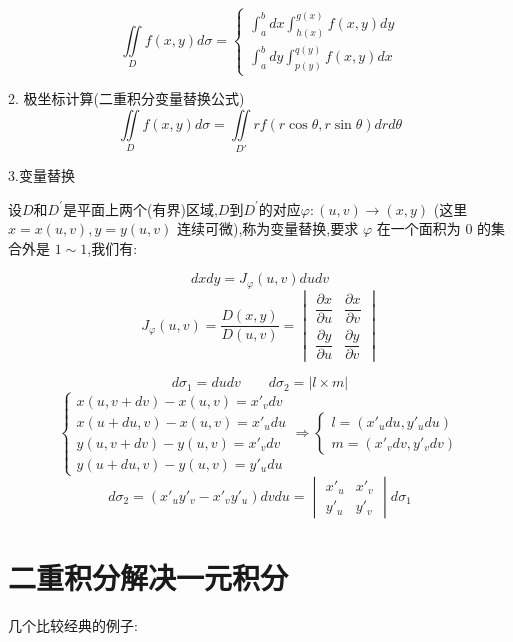 $$\iint\limits_{D}f(x,y)d\sigma=
\begin{cases} \int_{a}^{b}dx\int_{h(x)}^{g(x)}f(x,y)dy \\
	\int_{a}^{b}dy\int_{p(y)}^{q(y)}f(x,y)dx\end{cases}$$

2. 极坐标计算(二重积分变量替换公式)\label{def: 极坐标计算二重积分}
$$\iint\limits_{D}f(x,y)d\sigma=\iint\limits_{D'}rf(r\cos \theta,r\sin \theta)drd\theta$$

3.变量替换\label{def: 变量替换}

设$D$和$D^{'}$是平面上两个(有界)区域,$D$到$D^{'}$的对应$\varphi :(u,v)\rightarrow(x,y)$ (这里 $x=x(u,v),y=y(u,v)$ 连续可微),称为变量替换,要求 $\varphi$ 在一个面积为 $0$ 的集合外是 $1\sim 1$,我们有:

$$dxdy=J_{\varphi}(u,v)dudv$$ 
$$J_{\varphi}(u,v)=\dfrac{D(x,y)}{D(u,v)}=
\begin{vmatrix}
	\dfrac{\partial x}{\partial u} & \dfrac{\partial x}{\partial v} \\
	\dfrac{\partial y}{\partial u} & \dfrac{\partial y}{\partial v}
\end{vmatrix}
$$

\begin{anymark}[注]
	$$d\sigma_{1}=dudv \qquad d\sigma_{2}=|l\times m|$$
	$$\begin{cases}
		x(u,v+dv)-x(u,v)=x'_{v}dv \\
		x(u+du,v)-x(u,v)=x'_{u}du \\
		y(u,v+dv)-y(u,v)=x'_{v}dv \\
		y(u+du,v)-y(u,v)=y'_{u}du
	 \end{cases}\Rightarrow 
	 \begin{cases}
		l=(x'_{u}du,y'_{u}du) \\
		m=(x'_{v}dv,y'_{v}dv)  
	\end{cases}$$
	$$d\sigma_{2}=(x'_{u}y'_{v}-x'_{v}y'_{u})dvdu=\begin{vmatrix}
			x'_{u} & x'_{v} \\
			y'_{u} & y'_{v}
		\end{vmatrix}d\sigma_{1}$$
\end{anymark}
\section{二重积分解决一元积分}
几个比较经典的例子:

